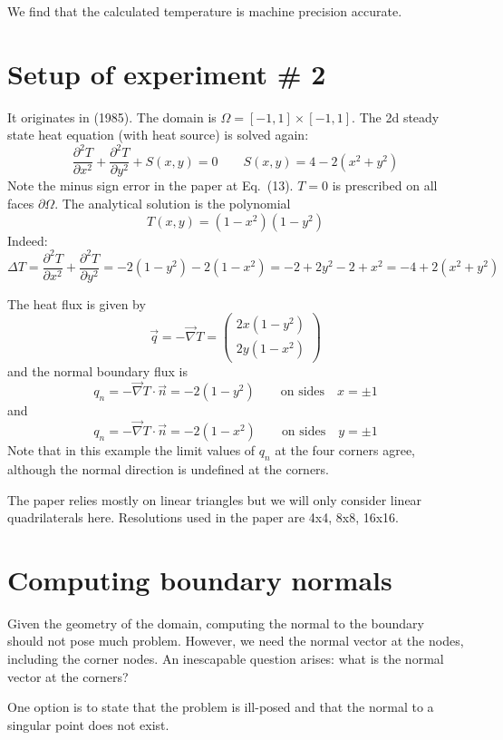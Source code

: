 We find that the calculated temperature is machine precision accurate.

\section*{Setup of experiment \# 2}

It originates in \textcite{cacs85} (1985). The domain is $\Omega=[-1,1]\times [-1,1]$.
The 2d steady state heat equation (with heat source) is solved again:
\[
\frac{\partial^2 T}{\partial x^2} + \frac{\partial^2 T}{\partial y^2} + S(x,y) = 0
\qquad
S(x,y)=4-2(x^2+y^2)
\]
Note the minus sign error in the paper at Eq.~(13).
$T=0$ is prescribed on all faces $\partial \Omega$.
The analytical solution is the polynomial
\[
T(x,y)=(1-x^2)(1-y^2)
\]
Indeed:
\[
\Delta T = \frac{\partial^2 T}{\partial x^2} + \frac{\partial^2 T}{\partial y^2}
= -2(1-y^2) -2(1-x^2)
= -2 + 2y^2 -2 + x^2
= -4 + 2(x^2+y^2)
\]


The heat flux is given by 
\[
\vec{q} = -\vec\nabla T = 
\left(
\begin{array}{c}
2x(1-y^2) \\
2y(1-x^2)
\end{array}
\right)
\]
and the normal boundary flux is 
\[
{q}_n=-\vec\nabla T \cdot \vec{n}=-2(1-y^2) \qquad \text{on sides} \quad x=\pm 1
\]
and
\[
{q}_n=-\vec\nabla T \cdot \vec{n}=-2(1-x^2) \qquad \text{on sides} \quad y=\pm 1
\]
Note that in this example the limit values of $q_n$ at the four corners agree, 
although the normal direction is undefined at the corners.

The paper relies mostly on linear triangles but we will only consider 
linear quadrilaterals here.
Resolutions used in the paper are 4x4, 8x8, 16x16.


\section*{Computing boundary normals}

Given the geometry of the domain, computing the normal to the boundary 
should not pose much problem. However, we need the normal vector at the nodes,
including the corner nodes. An inescapable question arises: 
what is the normal vector at the corners?

One option is to state that the problem is ill-posed and that the normal to a
singular point does not exist.

